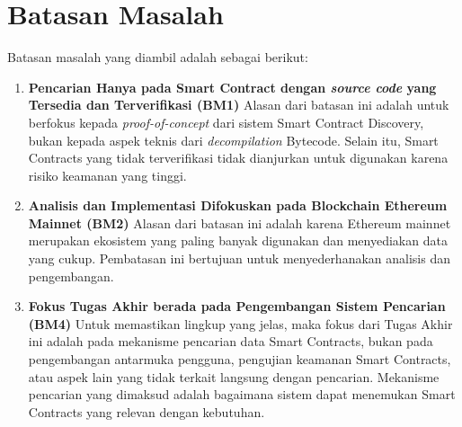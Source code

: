 \section{Batasan Masalah}
\label{sec:batasan-masalah}


Batasan masalah yang diambil adalah sebagai berikut:

\begin{enumerate}
	\item \textbf{Pencarian Hanya pada Smart Contract dengan \textit{\textit{source code}} yang Tersedia dan Terverifikasi (BM1)} \newline
	      Alasan dari batasan ini adalah untuk berfokus kepada \textit{proof-of-concept} dari sistem Smart Contract Discovery, bukan kepada aspek teknis dari \textit{decompilation} Bytecode. Selain itu, Smart Contracts yang tidak terverifikasi tidak dianjurkan untuk digunakan karena risiko keamanan yang tinggi.
	\item \textbf{Analisis dan Implementasi Difokuskan pada Blockchain Ethereum Mainnet (BM2)} \newline
	      Alasan dari batasan ini adalah karena Ethereum mainnet merupakan ekosistem yang paling banyak digunakan dan menyediakan data yang cukup. Pembatasan ini bertujuan untuk menyederhanakan analisis dan pengembangan.
	\item \textbf{Fokus Tugas Akhir berada pada Pengembangan Sistem Pencarian (BM4)} \newline
	      Untuk memastikan lingkup yang jelas, maka fokus dari Tugas Akhir ini adalah pada mekanisme pencarian data Smart Contracts, bukan pada pengembangan antarmuka pengguna, pengujian keamanan Smart Contracts, atau aspek lain yang tidak terkait langsung dengan pencarian. Mekanisme pencarian yang dimaksud adalah bagaimana sistem dapat menemukan Smart Contracts yang relevan dengan kebutuhan.
\end{enumerate}